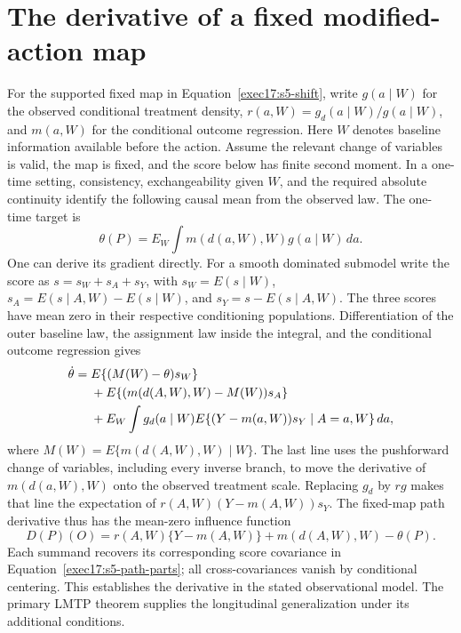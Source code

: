 \section{The derivative of a fixed modified-action map}
\label{exec17:s5-derivative}

For the supported fixed map in Equation~\eqref{exec17:s5-shift}, write
$g(a\mid W)$ for the observed conditional treatment density,
$r(a,W)=g_d(a\mid W)/g(a\mid W)$, and $m(a,W)$ for the conditional outcome
regression. Here $W$ denotes baseline information available before the action.
Assume the relevant change of variables is valid, the map is fixed, and the
score below has finite second moment. In a one-time setting, consistency,
exchangeability given $W$, and the required absolute continuity identify the
following causal mean from the observed law. The one-time target is
\begin{equation}
 \theta(P)=E_W\int m(d(a,W),W)g(a\mid W)\,da.
 \label{exec17:s5-lmtp-target}
\end{equation}
One can derive its gradient directly. For a smooth dominated submodel write
the score as $s=s_W+s_A+s_Y$, with
$s_W=E(s\mid W)$,
$s_A=E(s\mid A,W)-E(s\mid W)$, and
$s_Y=s-E(s\mid A,W)$. The three scores have mean zero in their respective
conditioning populations. Differentiation of the outer baseline law, the
assignment law inside the integral, and the conditional outcome regression
gives
\begin{align}
 \dot\theta={}&E\{(M(W)-\theta)s_W\}\notag\\
 &+E\{(m(d(A,W),W)-M(W))s_A\}\notag\\
 &+E_W\int g_d(a\mid W)
       E\{(Y-m(a,W))s_Y\mid A=a,W\}\,da ,
 \label{exec17:s5-path-parts}
\end{align}
where $M(W)=E\{m(d(A,W),W)\mid W\}$. The last line uses the pushforward
change of variables, including every inverse branch, to move the derivative
of $m(d(a,W),W)$ onto the observed treatment scale. Replacing $g_d$ by $rg$
makes that line the expectation of $r(A,W)(Y-m(A,W))s_Y$.
The fixed-map path derivative thus has the mean-zero influence function
\begin{equation}
 D(P)(O)=r(A,W)\{Y-m(A,W)\}+m(d(A,W),W)-\theta(P).
 \label{exec17:s5-lmtp-if}
\end{equation}
Each summand recovers its corresponding score covariance in
Equation~\eqref{exec17:s5-path-parts}; all cross-covariances vanish by
conditional centering. This establishes the derivative in the stated
observational model. The primary LMTP theorem supplies the longitudinal
generalization under its additional conditions.\citep{lmtp2023}

